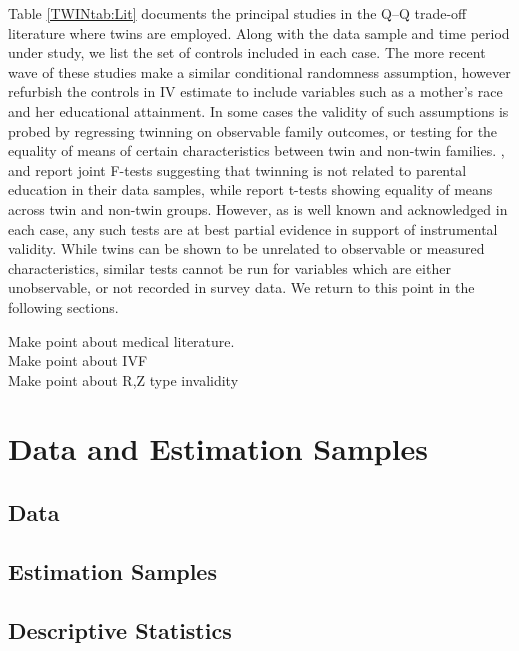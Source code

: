 \documentclass[subeqn]{article}
\begin{document}
\begin{spacing}{1.4}
Table \ref{TWINtab:Lit} documents the principal studies in the Q--Q trade-off 
literature where twins are employed.  Along with the data sample and time period 
under study, we list the set of controls included in each case.  The more recent
wave of these studies make a similar conditional randomness assumption, however
refurbish the controls in IV estimate to include variables such as a mother's 
race and her educational attainment.  In some cases the validity of such 
assumptions is probed by regressing twinning on observable family outcomes, or 
testing for the equality of means of certain characteristics between twin and
non-twin families. \citet{Blacketal2005}, \citet{Lietal2008} and 
\citet{Sanhueza2009} report joint F-tests suggesting that twinning is not related 
to parental education in their data samples, while \citet{RosenzweigZhang2009} 
report t-tests showing equality of means across twin and non-twin groups. 
However, as is well known and acknowledged in each case, any such tests are at 
best partial evidence in support of instrumental validity. While twins can be 
shown to be unrelated to observable or measured characteristics, similar tests 
cannot be run for variables which are either unobservable, or not recorded in 
survey data. We return to this point in the following sections.



Make point about medical literature.\\
Make point about IVF\\
Make point about R,Z type invalidity


\section{Data and Estimation Samples}              \label{TWINscn:data}
\subsection{Data}                                  \label{TWINsscn:data}
\subsection{Estimation Samples}                    \label{TWINsscn:samples}
\subsection{Descriptive Statistics}                \label{TWINsscn:descriptives}




\end{spacing}
\end{document}
